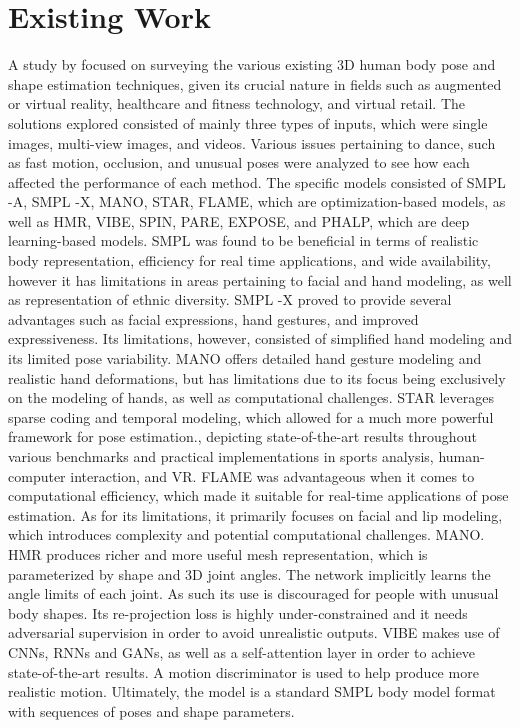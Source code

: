 
\section{Existing Work}

A study by \citet{venkatrayappa2024survey3dhumanbody} focused on surveying the various existing 3D human body pose and shape estimation techniques, given its crucial nature in fields such as augmented or virtual reality, healthcare and fitness technology, and virtual retail. The solutions explored consisted of mainly three types of inputs, which were single images, multi-view images, and videos. Various issues pertaining to dance, such as fast motion, occlusion, and unusual poses were analyzed to see how each affected the performance of each method. The specific models consisted of SMPL -A, SMPL -X, MANO, STAR, FLAME, which are optimization-based models, as well as HMR, VIBE, SPIN, PARE, EXPOSE, and PHALP, which are deep learning-based models. 
SMPL was found to be beneficial in terms of realistic body representation, efficiency for real time applications, and wide availability, however it has limitations in areas pertaining to facial and hand modeling, as well as representation of ethnic diversity. 
SMPL -X proved to provide several advantages such as facial expressions, hand gestures, and improved expressiveness. Its limitations, however, consisted of simplified hand modeling and its limited pose variability. 
MANO offers detailed hand gesture modeling and realistic hand deformations, but has limitations due to its focus being exclusively on the modeling of hands, as well as computational challenges. 
STAR leverages sparse coding and temporal modeling, which allowed for a much more powerful framework for pose estimation., depicting state-of-the-art results throughout various benchmarks and practical implementations in sports analysis, human-computer interaction, and VR. 
FLAME was advantageous when it comes to computational efficiency, which made it suitable for real-time applications of pose estimation. As for its limitations, it primarily focuses on facial and lip modeling, which introduces complexity and potential computational challenges. MANO.
HMR produces richer and more useful mesh representation, which is parameterized by shape and 3D joint angles. The network implicitly learns the angle limits of each joint. As such its use is discouraged for people with unusual body shapes. Its re-projection loss is highly under-constrained and it needs adversarial supervision in order to avoid unrealistic outputs. 
VIBE makes use of CNNs, RNNs and GANs, as well as a self-attention layer in order to achieve state-of-the-art results. A motion discriminator is used to help produce more realistic motion. Ultimately, the model is a standard SMPL body model format with sequences of poses and shape parameters. 
